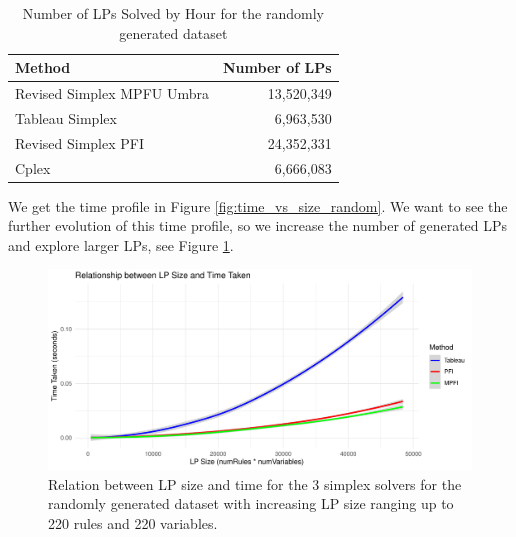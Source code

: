 \begin{table}[!htb]
    \centering
    \caption{Number of LPs Solved by Hour for the randomly generated dataset}
    \begin{tabular}{l|r}
        \toprule
        Method                     & Number of LPs \\
        \midrule
        Revised Simplex MPFU Umbra & 13,520,349    \\
        Tableau Simplex            & 6,963,530     \\
        Revised Simplex PFI        & 24,352,331    \\
        Cplex                      & 6,666,083     \\
        \bottomrule
    \end{tabular}
    \label{fig:lps_per_hour_random}
\end{table}

We get the time profile in Figure \ref{fig:time_vs_size_random}.
We want to see the further evolution of this time profile, so we increase the number of generated LPs
and explore larger LPs, see Figure \ref{fig:size_time_random_large}.

\begin{figure}[!htb]
    \centering
    \includegraphics[width=\linewidth]{figures/size_time_random_large.pdf}
    \caption{Relation between LP size and time for the 3 simplex solvers for the randomly generated
        dataset with increasing LP size ranging up to 220 rules and 220 variables.}
    \label{fig:size_time_random_large}
\end{figure}

